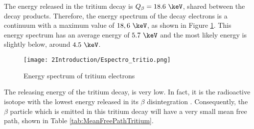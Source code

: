 The energy released in the tritium decay is $Q_\beta=18.6~\keV$, shared between the decay products. Therefore, the energy spectrum of the decay electrons is a continuum with a maximum value of $18,6~\keV$, as shown in Figure \ref{fig:TritiumDecaySpectrum}. This energy spectrum has an average energy of $5.7~\keV$ and the most likely energy is slightly below, around $4.5~\keV$.

\begin{figure}[hbtp]
\texttt{[image: 2Introduction/Espectro\_tritio.png]}
\centering
\caption{Energy spectrum of tritium electrons ~\cite{TritiumEspectrum}\label{fig:TritiumDecaySpectrum}}
\end{figure}



The releasing energy of the tritium decay, is very low. In fact, it is the radioactive isotope with the lowest energy released in its $\beta$ disintegration \cite{TritiumHandling}. Consequently, the $\beta$ particle which is emitted in this tritium decay will have a very small mean free path, shown in Table \ref{tab:MeanFreePathTritium}.

